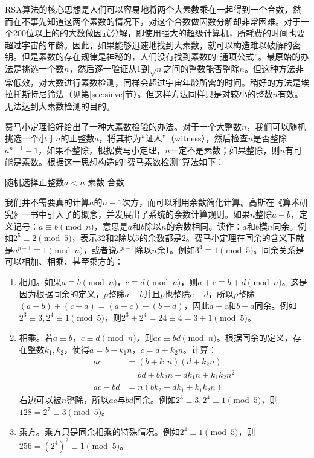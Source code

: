 \documentclass[b5paper]{ctexart}
\begin{document}
RSA算法的核心思想是人们可以容易地将两个大素数乘在一起得到一个合数，然而在不事先知道这两个素数的情况下，对这个合数做因数分解却非常困难。对于一个200位以上的的大数做因式分解，即使用强大的超级计算机，所耗费的时间也要超过宇宙的年龄。因此，如果能够迅速地找到大素数，就可以构造难以破解的密钥。但是素数的存在规律是神秘的，人们没有找到素数的“通项公式”。最原始的办法是挑选一个数$n$，然后逐一验证从1到$\sqrt{n}$之间的整数能否整除$n$。但这种方法非常低效，对大数进行素数检测，同样会超过宇宙年龄所需的时间。稍好的方法是埃拉托斯特尼筛法（见第\ref{sec:sieve}节）。但这样方法同样只是对较小的整数$n$有效。无法达到大素数检测的目的。

费马小定理恰好给出了一种大素数检验的办法。对于一个大整数$n$，我们可以随机挑选一个小于$n$的正整数$a$，将其称为“证人”（witness），然后检查$n$是否整除$a^{n-1} - 1$，如果不整除，根据费马小定理，$n$一定不是素数；如果整除，则$n$有可能是素数。根据这一思想构造的“费马素数检测”算法如下：

\begin{algorithmic}
  \State 随机选择正整数$a < n$
    \State \Return 素数
  \Else
    \State \Return 合数
  \EndIf
\EndFunction
\end{algorithmic}

我们并不需要真的计算$a$的$n-1$次方，而可以利用余数简化计算。高斯在《算术研究》一书中引入了的概念，并发展出了系统的余数计算规则。如果$n$整除$a - b$，定义记号：$a \equiv b \pmod{n}$，意思是$a$和$b$除以$n$的余数相同。读作：$a$和$b$模$n$同余。例如$2^5 \equiv 2 \pmod{5}$，表示32和2除以5的余数都是2。费马小定理在同余的含义下就是$a^{p-1} \equiv 1 \pmod{n}$，或者说$a^{p-1}$除以$n$余1。例如$3^4 \equiv 1 \pmod{5}$。同余关系是可以相加、相乘、甚至乘方的：

\begin{enumerate}[(1)]
\item 相加。如果$a \equiv b \pmod{n}$，$c \equiv d \pmod{n}$，则$a + c \equiv b + d \pmod{n}$。这是因为根据同余的定义，$p$整除$a - b$并且$p$也整除$c - d$，所以$p$整除$(a - b) + (c - d) = (a + c) - (b + d)$，因此$a + c$和$b + d$同余。例如$2^3 \equiv 3, 2^4 \equiv 1 \pmod{5}$，则$2^3 + 2^4 = 24 \equiv 4 = 3 + 1 \pmod{5}$。

\item 相乘。若$a \equiv b，c \equiv d \pmod{n}$，则$ac \equiv bd \pmod{n}$。根据同余的定义，存在整数$k_1, k_2$，使得$a = b + k_1n$，$c = d + k_2n$。计算：
  \begin{align*}
    ac &= (b + k_1n)(d + k_2n) \\
       &= bd + bk_2n + dk_1n + k_1k_2n^2 \\
    ac - bd &= n(bk_2 + dk_1 + k_1k_2n)
  \end{align*}
右边可以被$n$整除，所以$ac$与$bd$同余。例如$2^3 \equiv 3, 2^4 \equiv 1 \pmod{5}$，则$128 = 2^7 \equiv 3 \pmod{5}$。

\item 乘方。乘方只是同余相乘的特殊情况。例如$2^4 \equiv 1 \pmod{5}$，则$256 = (2^4)^2 \equiv 1 \pmod{5}$。
\end{enumerate}
\end{document}
